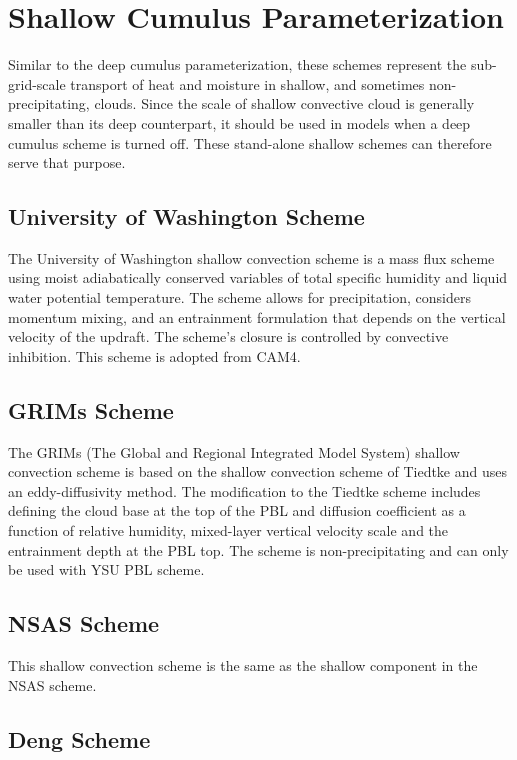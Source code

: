 \section{Shallow Cumulus Parameterization}

Similar to the deep cumulus parameterization, these schemes represent the sub-grid-scale transport of heat 
and moisture in shallow, and sometimes non-precipitating, clouds. Since the scale of shallow convective
cloud is generally smaller than its deep counterpart, it should be used in models when a deep cumulus
scheme is turned off. These stand-alone shallow schemes can therefore serve that purpose. 

\subsection{University of Washington Scheme}

The University of Washington shallow convection scheme is a mass flux scheme \citep{park09} using moist 
adiabatically conserved variables of total specific humidity and liquid water potential 
temperature. The scheme allows for precipitation, considers momentum mixing, and an entrainment 
formulation that depends on the vertical velocity of the updraft. The scheme's closure is 
controlled by convective inhibition. This scheme is adopted from CAM4.

\subsection{GRIMs Scheme}

The GRIMs (The Global and Regional Integrated Model System) shallow convection scheme \citep{hong18} is based 
on the shallow convection scheme of Tiedtke and uses an eddy-diffusivity method. The modification 
to the Tiedtke scheme includes defining the cloud base at the top of the PBL and diffusion 
coefficient as a function of relative humidity, mixed-layer vertical velocity scale and the 
entrainment depth at the PBL top. The scheme is non-precipitating and can only be used with YSU PBL scheme.

\subsection{NSAS Scheme}

This shallow convection scheme is the same as the shallow component in the NSAS scheme.

\subsection{Deng Scheme}

